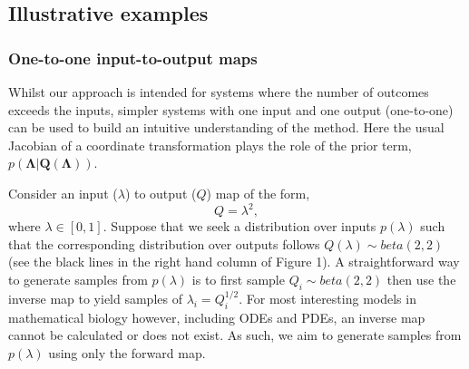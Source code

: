 \documentclass[10pt,letterpaper]{article}
\begin{document}
\subsection{Illustrative examples}\label{sec:illustrativeExamples}

\subsubsection{One-to-one input-to-output maps}
\label{sec:one-2-one}
Whilst our approach is intended for systems where the number of outcomes exceeds the inputs, simpler systems with one input and one output (one-to-one) can be used to build an intuitive understanding of the method. Here the usual Jacobian of a coordinate transformation plays the role of the prior term,  $p(\boldsymbol{\Lambda}|\boldsymbol{Q}(\boldsymbol{\Lambda}))$.

\bigskip
{}

Consider an input ($\lambda$) to output ($Q$) map of the form,
%
\begin{equation}\label{eq:quadratic_functional}
Q = \lambda^{2},
\end{equation}
%
where $\lambda\in[0,1]$. Suppose that we seek a distribution over inputs $p(\lambda)$ such that the corresponding distribution over outputs follows $Q(\lambda) \sim beta(2,2)$ (see the black lines in the right hand column of Figure 1). A straightforward way to generate samples from $p(\lambda)$ is to first sample $Q_i \sim beta(2,2)$ then use the inverse map to yield samples of $\lambda_i = Q_i^{1/2}$. For most interesting models in mathematical biology however, including ODEs and PDEs, an inverse map cannot be calculated or does not exist. As such, we aim to generate samples from $p(\lambda)$ using only the forward map.
\end{document}
